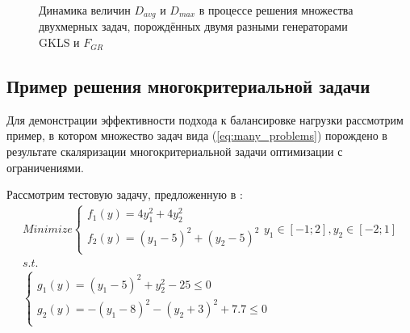 \begin{figure}[ht]
    \centering
    \caption{Динамика величин \(D_{avg}\) и \(D_{max}\) в процессе решения множества двухмерных задач,
    порождённых двумя разными генераторами GKLS и \(F_{GR}\)}
    \label{fig:devs_mixed}
\end{figure}

\subsection{Пример решения многокритериальной задачи}

Для демонстрации эффективности подхода к балансировке нагрузки рассмотрим пример,
в котором множество задач вида (\ref{eq:many_problems}) порождено в результате скаляризации
многокритериальной задачи оптимизации с ограничениями.

Рассмотрим тестовую задачу, предложенную в \cite{BinhKorn1999}:
\begin{equation}
  \label{eq:mco_probem}
  \begin{array}{l}
      Minimize \left \{
      \begin{array}{l}
        f_1(y) = 4 y_1^2 + 4 y_2^2 \\
        f_2(y) = (y_1-5)^2 + (y_2-5)^2 \\
      \end{array}
      \right .
      y_1\in [-1;2],y_2\in [-2;1]
      \\s.t.
      \\
      \left \{
      \begin{array}{l}
        g_1(y) = (y_1 - 5)^2 + y_2^2 - 25 \leqslant 0 \\
        g_2(y) = -(y_1 - 8)^2 - (y_2 + 3)^2 + 7.7 \leqslant 0\\
      \end{array}
      \right .
  \end{array}
\end{equation}

